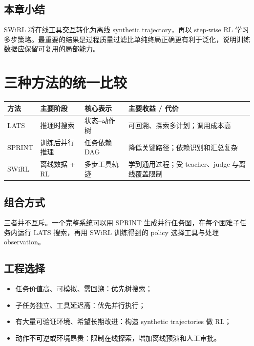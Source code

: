 \documentclass[a4paper]{article}
\begin{document}
\subsection{本章小结}

SWiRL 将在线工具交互转化为离线 synthetic trajectory，再以 step-wise RL 学习多步策略。最重要的结果是过程质量过滤比单纯终局正确更有利于泛化，说明训练数据应保留可复用的局部能力。

\section{三种方法的统一比较}

\begin{table}[H]
\centering
\small
\begin{tabular}{>{\raggedright\arraybackslash}p{2.2cm}>{\raggedright\arraybackslash}p{3.4cm}>{\raggedright\arraybackslash}p{3.4cm}>{\raggedright\arraybackslash}p{4.2cm}}
\toprule
\textbf{方法} & \textbf{主要阶段} & \textbf{核心表示} & \textbf{主要收益 / 代价} \\
\midrule
LATS & 推理时搜索 & 状态--动作树 & 可回溯、探索多计划；调用成本高 \\
SPRINT & 训练后并行推理 & 任务依赖 DAG & 降低关键路径；依赖识别和汇总复杂 \\
SWiRL & 离线数据 + RL & 多步工具轨迹 & 学到通用过程；受 teacher、judge 与离线覆盖限制 \\
\bottomrule
\end{tabular}
\end{table}

\subsection{组合方式}

三者并不互斥。一个完整系统可以用 SPRINT 生成并行任务图，在每个困难子任务内运行 LATS 搜索，再用 SWiRL 训练得到的 policy 选择工具与处理 observation。

\subsection{工程选择}

\begin{itemize}
    \item 任务价值高、可模拟、需回溯：优先树搜索；
    \item 子任务独立、工具延迟高：优先并行执行；
    \item 有大量可验证环境、希望长期改进：构造 synthetic trajectories 做 RL；
    \item 动作不可逆或环境昂贵：限制在线探索，增加离线预演和人工审批。
\end{itemize}
\end{document}

